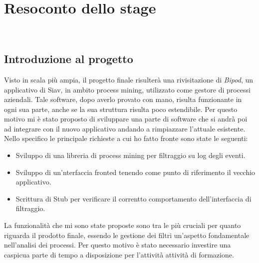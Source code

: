 
\chapter{Resoconto dello stage}
\label{cap:descrizione-stage}

\\

\section{Introduzione al progetto}
Visto in scala più ampia, il progetto finale risulterà una rivisitazione di \textit{Bipod}, un applicativo di Siav, in ambito process mining, utilizzato come gestore di processi aziendali.
Tale software, dopo averlo provato con mano, risulta funzionante in ogni sua parte, anche se la sua struttura risulta poco estendibile. Per questo motivo mi è stato proposto di sviluppare una parte di software che si andrà poi ad integrare con il nuovo applicativo andando a rimpiazzare l'attuale esistente.
Nello specifico le principale richieste a cui ho fatto fronte sono state le seguenti:
\begin{itemize}
	\item Sviluppo di una libreria di process mining per filtraggio su log degli eventi.
	\item Sviluppo di un'nterfaccia fronted tenendo come punto di riferimento il vecchio applicativo.
	\item Scrittura di Stub per verificare il correntto comportamento dell'interfaccia di filtraggio.
\end{itemize}
La funzionalità che mi sono state proposte sono tra le più cruciali per quanto riguarda il prodotto finale, essendo le gestione dei filtri un'aspetto fondamentale nell'analisi dei processi. Per questo motivo è stato necessario investire una caspicua parte di tempo a disposizione per l'attività attività di formazione.
